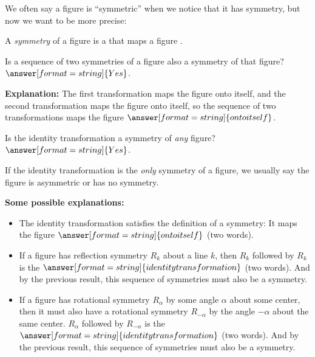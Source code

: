 \documentclass[nooutcomes]{ximera}
\begin{document}
\begin{question}
We often say a figure is ``symmetric'' when we notice that it has symmetry, but now we want to be more precise:  

A \emph{symmetry} of a figure is a
that maps a figure 
.  
\end{question}

\begin{question}
Is a sequence of two symmetries of a figure also a symmetry of that figure?
$\answer[format=string]{Yes}$.
\begin{question}
\textbf{Explanation:} The first transformation maps the figure onto itself, and the second transformation maps the figure onto itself, so the sequence of two transformations maps the figure $\answer[format=string]{onto itself}$.  
\end{question}
\end{question}

\begin{question}
Is the identity transformation a symmetry of \emph{any} figure? 
$\answer[format=string]{Yes}$.
\begin{feedback}[correct]
If the identity transformation is the \emph{only} symmetry of a figure, we usually say the figure is asymmetric or has no symmetry.  
\end{feedback}
\begin{question}
\textbf{Some possible explanations:} 
\begin{itemize}
\item The identity transformation satisfies the definition of a symmetry: It maps the figure $\answer[format=string]{onto itself}$ (two words). 
\item If a figure has reflection symmetry $R_k$ about a line $k$, then $R_k$ followed by $R_k$ is the $\answer[format=string]{identity transformation}$ (two words).  And by the previous result, this sequence of symmetries must also be a symmetry.  
\item If a figure has rotational symmetry $R_\alpha$ by some angle $\alpha$ about some center, then it must also have a rotational symmetry $R_{-\alpha}$ by the angle $-\alpha$ about the same center.  $R_\alpha$ followed by $R_{-\alpha}$ is the $\answer[format=string]{identity transformation}$ (two words).  And by the previous result, this sequence of symmetries must also be a symmetry.  
\end{itemize}
\end{question}
\end{question}
\end{document}
